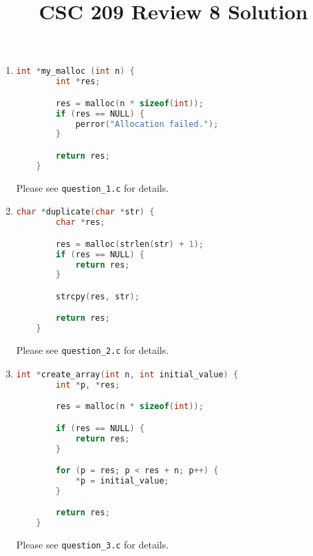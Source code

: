 \documentclass[12pt]{article}
\begin{document}
\title{CSC 209 Review 8 Solution}
\maketitle

\bigskip

\begin{enumerate}[1.]
    \item

\begin{lstlisting}[language=c]
    int *my_malloc (int n) {
        int *res;

        res = malloc(n * sizeof(int));
        if (res == NULL) {
            perror("Allocation failed.");
        }

        return res;
    }
\end{lstlisting}

    \bigskip

    Please see \texttt{question\_1.c} for details.

    \item

\begin{lstlisting}[language=c]
    char *duplicate(char *str) {
        char *res;

        res = malloc(strlen(str) + 1);
        if (res == NULL) {
            return res;
        }

        strcpy(res, str);

        return res;
    }
\end{lstlisting}

    \bigskip

    Please see \texttt{question\_2.c} for details.

    \item

\begin{lstlisting}[language=c]
    int *create_array(int n, int initial_value) {
        int *p, *res;

        res = malloc(n * sizeof(int));

        if (res == NULL) {
            return res;
        }

        for (p = res; p < res + n; p++) {
            *p = initial_value;
        }

        return res;
    }
\end{lstlisting}

    \bigskip

    Please see \texttt{question\_3.c} for details.


\end{enumerate}
\end{document}
